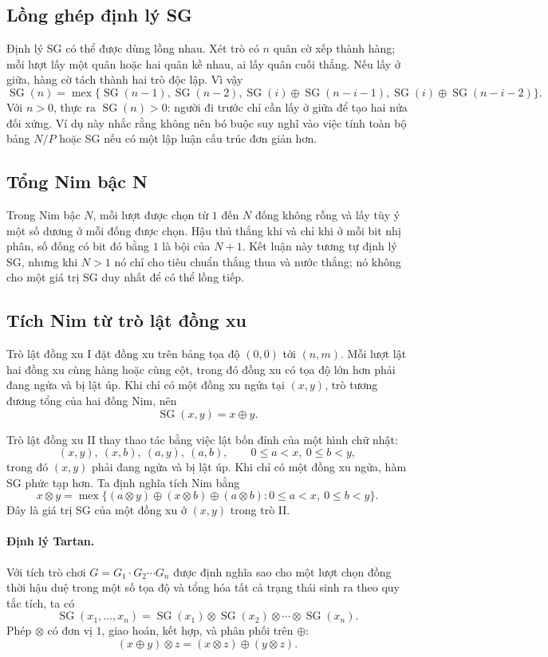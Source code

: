 \documentclass[11pt]{article}
\newcommand{\SG}{\operatorname{SG}}
\newcommand{\mex}{\operatorname{mex}}
\newcommand{\xor}{\oplus}
\newcommand{\nimprod}{\otimes}
\begin{document}
\subsection{Lồng ghép định lý SG}

Định lý SG có thể được dùng lồng nhau. Xét trò có \(n\) quân cờ xếp thành hàng;
mỗi lượt lấy một quân hoặc hai quân kề nhau, ai lấy quân cuối thắng. Nếu lấy ở
giữa, hàng cờ tách thành hai trò độc lập. Vì vậy
\[
\SG(n)=\mex\{\SG(n-1),\SG(n-2),
\SG(i)\xor\SG(n-i-1),\SG(i)\xor\SG(n-i-2)\}.
\]
Với \(n>0\), thực ra \(\SG(n)>0\): người đi trước chỉ cần lấy ở giữa để tạo hai
nửa đối xứng. Ví dụ này nhắc rằng không nên bó buộc suy nghĩ vào việc tính
toàn bộ bảng \(N/P\) hoặc SG nếu có một lập luận cấu trúc đơn giản hơn.

\subsection{Tổng Nim bậc N}

Trong Nim bậc \(N\), mỗi lượt được chọn từ \(1\) đến \(N\) đống không rỗng và
lấy tùy ý một số dương ở mỗi đống được chọn. Hậu thủ thắng khi và chỉ khi ở
mỗi bit nhị phân, số đống có bit đó bằng \(1\) là bội của \(N+1\). Kết luận
này tương tự định lý SG, nhưng khi \(N>1\) nó chỉ cho tiêu chuẩn thắng thua và
nước thắng; nó không cho một giá trị SG duy nhất để có thể lồng tiếp.

\subsection{Tích Nim từ trò lật đồng xu}

Trò lật đồng xu I đặt đồng xu trên bảng tọa độ \((0,0)\) tới \((n,m)\). Mỗi
lượt lật hai đồng xu cùng hàng hoặc cùng cột, trong đó đồng xu có tọa độ lớn
hơn phải đang ngửa và bị lật úp. Khi chỉ có một đồng xu ngửa tại \((x,y)\),
trò tương đương tổng của hai đống Nim, nên
\[
  \SG(x,y)=x\xor y.
\]

Trò lật đồng xu II thay thao tác bằng việc lật bốn đỉnh của một hình chữ nhật:
\[
  (x,y),\ (x,b),\ (a,y),\ (a,b),\qquad 0\le a<x,\ 0\le b<y,
\]
trong đó \((x,y)\) phải đang ngửa và bị lật úp. Khi chỉ có một đồng xu ngửa,
hàm SG phức tạp hơn. Ta định nghĩa tích Nim bằng
\[
  x\nimprod y
  =\mex\{(a\nimprod y)\xor(x\nimprod b)\xor(a\nimprod b):
       0\le a<x,\ 0\le b<y\}.
\]
Đây là giá trị SG của một đồng xu ở \((x,y)\) trong trò II.

\paragraph{Định lý Tartan.}
Với tích trò chơi \(G=G_1\cdot G_2\cdots G_n\) được định nghĩa sao cho một lượt
chọn đồng thời hậu duệ trong một số tọa độ và tổng hóa tất cả trạng thái sinh
ra theo quy tắc tích, ta có
\[
  \SG(x_1,\ldots,x_n)=
  \SG(x_1)\nimprod\SG(x_2)\nimprod\cdots\nimprod\SG(x_n).
\]
Phép \(\nimprod\) có đơn vị \(1\), giao hoán, kết hợp, và phân phối trên
\(\xor\):
\[
  (x\xor y)\nimprod z=(x\nimprod z)\xor(y\nimprod z).
\]
\end{document}
